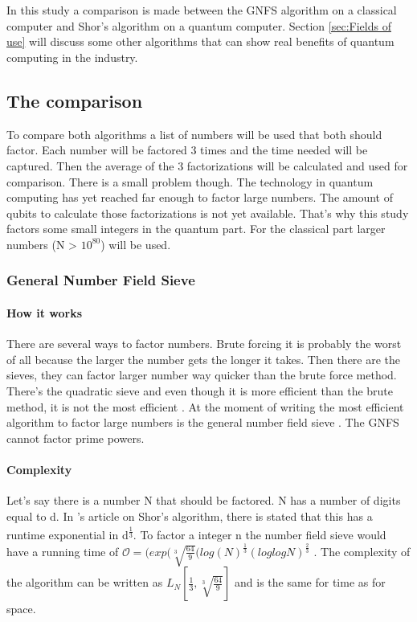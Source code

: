 
\chapter{}
\label{ch:onderzoek}



In this study a comparison is made between the GNFS algorithm on a classical computer and Shor's algorithm on a quantum computer.
Section \ref{sec:Fields of use} will discuss some other algorithms that can show real benefits of quantum computing in the industry.
\section{The comparison}

To compare both algorithms a list of numbers will be used that both should factor. Each number will be factored 3 times and the time needed will be captured. Then the average of the 3 factorizations will be calculated and used for comparison.
There is a small problem though. The technology in quantum computing has yet reached far enough to factor large numbers. The amount of qubits to calculate those factorizations is not yet available. 
That's why this study factors some small integers in the quantum part. For the classical part larger numbers (N > $10^{80}$) will be used.
\subsection{General Number Field Sieve}
\subsubsection{How it works}
There are several ways to factor numbers. Brute forcing it is probably the worst of all because the larger the number gets the longer it takes. Then there are the sieves, they can factor larger number way quicker than the brute force method.
There's the quadratic sieve and even though it is more efficient than the brute method, it is not the most efficient \autocite{Quadratic_sieve}. At the moment of writing the most efficient algorithm to factor large numbers is the general number field sieve \autocite{shor_algo}.
The GNFS cannot factor prime powers.

\subsubsection{Complexity}
Let's say there is a number N that should be factored. N has a number of digits equal to d. In \textcite{shor_algo}'s article on Shor's algorithm, there is stated that this has a runtime exponential in d\textsuperscript{$\frac{1}{3}$}.
To factor a integer n the number field sieve would have a running time of $\mathcal{O} = (exp(\sqrt[3]{\frac{64}{9}}(log(N)^\frac{1}{3}(log log N)^\frac{2}{3}$ \autocite{nfscomp}.
The complexity of the algorithm can be written as $L_N[\frac{1}{3},\sqrt[3]{\frac{64}{9}}]$ and is the same for time as for space.
